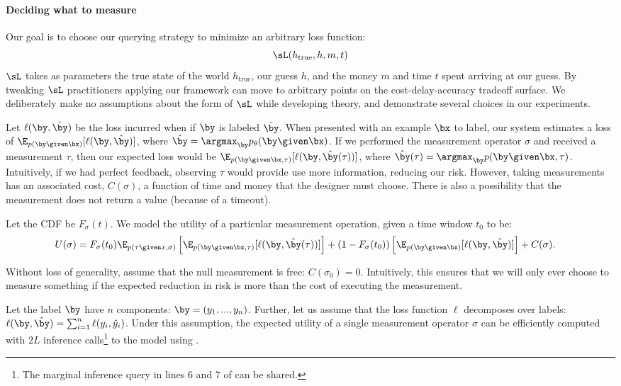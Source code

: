 \paragraph{Deciding what to measure}

Our goal is to choose our querying strategy to minimize an arbitrary loss function:
\[\sL(h_{\text{true}}, h, m, t)\]
$\sL$ takes as parameters the true state of the world $h_{\text{true}}$, our guess $h$, and the money $m$ and time $t$ spent arriving at our guess.
 By tweaking $\sL$ practitioners applying our framework can move to arbitrary points on the cost-delay-accuracy tradeoff surface.
 We deliberately make no assumptions about the form of $\sL$ while developing theory, and demonstrate several choices in our experiments.


Let $\ell(\by, \byt)$ be the loss incurred when if $\by$ is labeled $\byt$.
When presented with an example $\bx$ to label, our system estimates a loss of $\E_{p(\by \given \bx)}[\ell(\by, \byt)]$, where $\byt = \argmax_{\by} \p(\by \given \bx)$.
If we performed the measurement operator $\sigma$ and received a measurement $\tau$,
then our expected loss would be $\E_{p(\by \given \bx, \tau)}[\ell(\by, \byt(\tau))]$, where $\byt(\tau) = \argmax_{\by} p(\by \given \bx, \tau)$.
Intuitively, if we had perfect feedback, observing $\tau$ would provide use more information, reducing our risk.
However, taking measurements has an associated cost, $C(\sigma)$, a function of time and money that the designer must choose.
There is also a possibility that the measurement does not return a value (because of a timeout).

Let the CDF be $F_\sigma(t)$.
We model the utility of a particular measurement operation, given a time window $t_0$ to be:
\begin{align*}
U(\sigma)
&= F_\sigma(t_0) 
  \E_{p(\tau \given x, \sigma)} \left[\E_{p(\by \given \bx, \tau)}[\ell(\by, \byt(\tau))] \right]
  + (1 - F_\sigma(t_0)) 
    \left[\E_{p(\by \given \bx)}[\ell(\by, \byt)] \right]
  + C(\sigma).
\end{align*}

Without loss of generality, assume that the null measurement is free: $C(\sigma_0) = 0$.
Intuitively, this ensures that we will only ever choose to measure something if the expected reduction in risk is more than the cost of executing the measurement.

Let the label $\by$ have $n$ components: $\by = (y_1, ..., y_n)$.
Further, let us assume that the loss function $\ell$ decomposes over labels: $\ell(\by, \byt) = \sum_{i=1}^n \ell(y_i, \yt_i)$. 
Under this assumption, the expected utility of a single measurement operator $\sigma$ can be efficiently computed with $2L$ inference calls\footnote{The marginal inference query in lines 6 and 7 of  can be shared.} to the model using .

